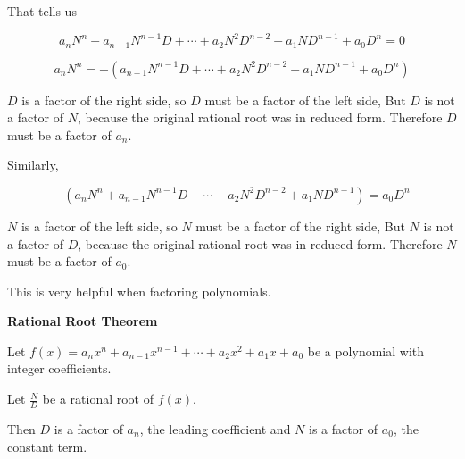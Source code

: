 \documentclass{ximera}
\begin{document}
That tells us

\[   a_n N^n + a_{n-1} N^{n-1} D + \cdots + a_2 N^2 D^{n-2}+ a_1 N D^{n-1} + a_0 D^n  = 0       \]



\[   a_n N^n  =   -(a_{n-1} N^{n-1} D + \cdots + a_2 N^2 D^{n-2}+ a_1 N D^{n-1} + a_0 D^n)      \]


$D$ is a factor of the right side, so $D$ must be a factor of the left side,  But $D$ is not a factor of $N$, because the original rational root was in reduced form.  Therefore $D$ must be a factor of $a_n$.




Similarly, 

\[   -(a_n N^n + a_{n-1} N^{n-1} D + \cdots + a_2 N^2 D^{n-2}+ a_1 N D^{n-1}) =  a_0 D^n        \]


$N$ is a factor of the left side, so $N$ must be a factor of the right side,  But $N$ is not a factor of $D$, because the original rational root was in reduced form.  Therefore $N$ must be a factor of $a_0$.




This is very helpful when factoring polynomials.





\begin{theorem} \textbf{\textcolor{-red!75!green}{Rational Root Theorem}} 


Let $ f(x) = a_n x^n + a_{n-1} x^{n-1} + \cdots + a_2 x^2 + a_1 x + a_0 $ be a polynomial with integer coefficients.

Let $\frac{N}{D}$ be a rational root of $f(x)$.

Then $D$ is a factor of $a_n$, the leading coefficient and $N$ is a factor of $a_0$, the constant term.

\end{theorem}
\end{document}
